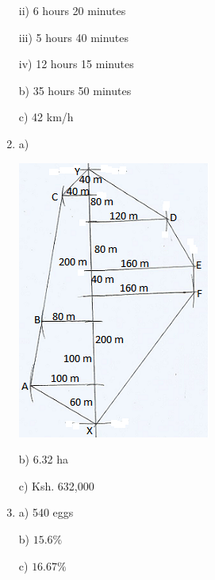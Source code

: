 \documentclass[
  a4paperpaper,
]{scrbook}
\begin{document}
\begin{tcolorbox}
\begin{enumerate}
  ii) 6 hours 20 minutes

  iii) 5 hours 40 minutes

  iv) 12 hours 15 minutes

  b) 35 hours 50 minutes

  c) 42 km/h
\item
  a)

  \includegraphics{figures/M4N19.png}

  b) 6.32 ha

  c) Ksh. 632,000
\item
  a) 540 eggs

  b) \(15.6\%\)

  c) \(16.67\%\)
\end{enumerate}

\end{tcolorbox}
\end{document}
